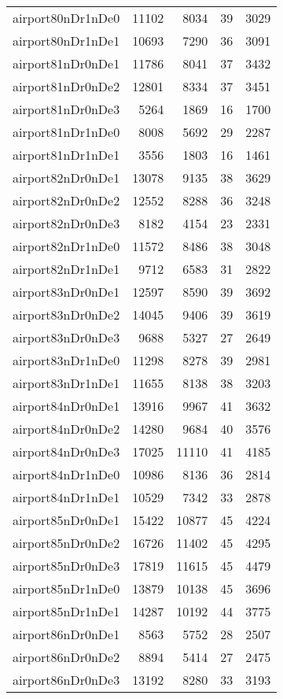 \begin{tabular}{lrrrr}
airport80nDr1nDe0 & 11102 & 8034 & 39 & 3029 \\
airport80nDr1nDe1 & 10693 & 7290 & 36 & 3091 \\
airport81nDr0nDe1 & 11786 & 8041 & 37 & 3432 \\
airport81nDr0nDe2 & 12801 & 8334 & 37 & 3451 \\
airport81nDr0nDe3 & 5264 & 1869 & 16 & 1700 \\
airport81nDr1nDe0 & 8008 & 5692 & 29 & 2287 \\
airport81nDr1nDe1 & 3556 & 1803 & 16 & 1461 \\
airport82nDr0nDe1 & 13078 & 9135 & 38 & 3629 \\
airport82nDr0nDe2 & 12552 & 8288 & 36 & 3248 \\
airport82nDr0nDe3 & 8182 & 4154 & 23 & 2331 \\
airport82nDr1nDe0 & 11572 & 8486 & 38 & 3048 \\
airport82nDr1nDe1 & 9712 & 6583 & 31 & 2822 \\
airport83nDr0nDe1 & 12597 & 8590 & 39 & 3692 \\
airport83nDr0nDe2 & 14045 & 9406 & 39 & 3619 \\
airport83nDr0nDe3 & 9688 & 5327 & 27 & 2649 \\
airport83nDr1nDe0 & 11298 & 8278 & 39 & 2981 \\
airport83nDr1nDe1 & 11655 & 8138 & 38 & 3203 \\
airport84nDr0nDe1 & 13916 & 9967 & 41 & 3632 \\
airport84nDr0nDe2 & 14280 & 9684 & 40 & 3576 \\
airport84nDr0nDe3 & 17025 & 11110 & 41 & 4185 \\
airport84nDr1nDe0 & 10986 & 8136 & 36 & 2814 \\
airport84nDr1nDe1 & 10529 & 7342 & 33 & 2878 \\
airport85nDr0nDe1 & 15422 & 10877 & 45 & 4224 \\
airport85nDr0nDe2 & 16726 & 11402 & 45 & 4295 \\
airport85nDr0nDe3 & 17819 & 11615 & 45 & 4479 \\
airport85nDr1nDe0 & 13879 & 10138 & 45 & 3696 \\
airport85nDr1nDe1 & 14287 & 10192 & 44 & 3775 \\
airport86nDr0nDe1 & 8563 & 5752 & 28 & 2507 \\
airport86nDr0nDe2 & 8894 & 5414 & 27 & 2475 \\
airport86nDr0nDe3 & 13192 & 8280 & 33 & 3193 \\

\end{tabular}
